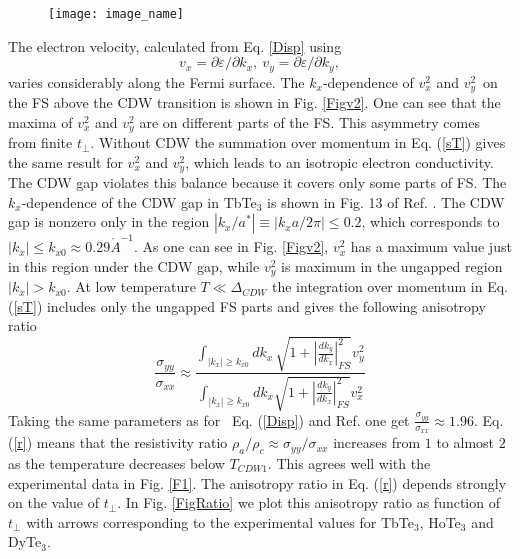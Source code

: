 \begin{figure}[h]
\texttt{[image: image\_name]}
\label{fig:label}
\end{figure}


The electron velocity, calculated from Eq. \ref{Disp} using
\begin{equation}
v_{x}=\partial \varepsilon /\partial k_{x},~v_{y}=\partial
\varepsilon /\partial k_{y},  \label{v}
\end{equation}
varies considerably along the Fermi surface. The $k_{x}$-dependence
of $v_{x}^{2}$ and $v_{y}^{2}$\ on the FS above the CDW transition
is shown in Fig. \ref{Figv2}. One can see that the maxima of
$v_{x}^{2}$ and $v_{y}^{2}$ are on different parts of the FS. This
asymmetry comes from finite $t_{\perp }$. Without CDW the summation
over momentum in Eq. (\ref{sT}) gives the same result for
$v_{x}^{2}$ and $v_{y}^{2}$, which leads to an isotropic electron
conductivity. The CDW gap violates this balance because it covers
only some parts of FS. The $k_{x}$-dependence of the CDW gap in
TbTe$_{3}$ is shown in Fig. 13 of Ref. \cite{Brouet08}. The CDW gap
is nonzero only in the region $\left\vert k_{x}/a^{\ast }\right\vert
\equiv \left\vert k_{x}a/2\pi \right\vert \leq 0.2$, which
corresponds to $\left\vert k_{x}\right\vert \leq k_{x0}\approx
0.29\mathring{A}^{-1}$. As one can see in Fig. \ref{Figv2},
$v_{x}^{2}$ has a maximum value just in this region under the CDW
gap, while $v_{y}^{2}$ is maximum in the ungapped region $\left\vert
k_{x}\right\vert >k_{x0}$. At low temperature $T\ll \Delta _{CDW}$
the integration over momentum in Eq. (\ref{sT}) includes only the
ungapped FS parts and gives the following anisotropy ratio
\cite{CommentInt}
\begin{equation}
\frac{\sigma _{yy}}{\sigma _{xx}}\approx \frac{\int_{\left\vert
k_{x}\right\vert \geq k_{x0}}dk_{x}\,\sqrt{1+\left\vert \frac{dk_{y}}{dk_{x}}
\right\vert _{FS}^{2}}v_{y}^{2}}{\int_{\left\vert k_{x}\right\vert
\geq
k_{x0}}dk_{x}\sqrt{1+\left\vert \frac{dk_{y}}{dk_{x}}\right\vert _{FS}^{2}}
v_{x}^{2}}  \label{r}
\end{equation}
Taking the same parameters as for \ Eq. (\ref{Disp}) and Ref.
\cite{Brouet08} one get $\frac{\sigma _{yy}}{\sigma _{xx}}\approx
1.96$. Eq. (\ref{r}) means that the resistivity ratio $\rho
_{a}/\rho _{c}\approx \sigma _{yy}/\sigma _{xx}$ increases from $1$
to almost $2$ as the temperature decreases below $T_{CDW1}$. This
agrees well with the experimental data in Fig. \ref{F1}. The
anisotropy ratio in Eq. (\ref{r}) depends strongly on the value of
$t_{\perp }$. In Fig. \ref{FigRatio} we plot this anisotropy ratio
as function of $t_{\perp }$ with arrows corresponding to the
experimental values for TbTe$_3$, HoTe$_3$ and DyTe$_3$.

